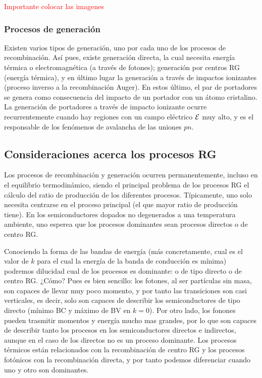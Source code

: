 \begin{Anotacion}
	\textcolor{red}{Importante colocar las imagenes}
\end{Anotacion}

\subsubsection{Procesos de generación}

Existen varios tipos de generación, uno por cada uno de los procesos de recombinación. Así pues, existe generación directa, la cual necesita energía térmica o electromagnética (a través de fotones); generación por centros RG (energía térmica), y en último lugar la generación a través de impactos ionizantes (proceso inverso a la recombinación Auger). En estos último, el par de portadores se genera como consecuencia del impacto de un portador con un átomo cristalino. La generación de portadores a través de impacto ionizante ocurre recurrentemente cuando hay regiones con un campo eléctrico $\mathcal{E}$ muy alto, y es el responsable de los fenómenos de avalancha de las uniones $pn$.

\subsection{Consideraciones acerca los procesos RG}

Los procesos de recombinación y generación ocurren permanentemente, incluso en el equilibrio termodinámico, siendo el principal problema de los procesos RG el cálculo del ratio de producción de los diferentes procesos. Típicamente, uno solo necesita centrarse en el proceso principal (el que mayor ratio de producción tiene). En los semiconductores dopados no degenerados a una temperatura ambiente, uno esperea que los procesos dominantes sean procesos directos o de centro RG. 

Conociendo la forma de las bandas de energía (más concretamente, cual es el valor de $k$ para el cual la energía de la banda de conducción es mínima) podremos dilucidad cual de los procesos es dominante: o de tipo directo o de centro RG. ¿Cómo? Pues es bien sencillo: los fotones, al ser partículas sin masa, son capaces de llevar muy poco momento, y por tanto las transiciones son casi verticales, es decir, solo son capaces de describir los semiconductores de tipo directo (mínimo BC y máximo de BV en $k=0$). Por otro lado, los fonones pueden trasmitir momentos y energía mucho mas grandes, por lo que son capaces de describir tanto los procesos en los semiconductores directos e indirectos, aunque en el caso de los directos no es un proceso dominante. Los procesos térmicos están relacionados con la recombinación de centro RG y los procesos fotónicos con la recombinación directa, y por tanto podemos diferenciar cuando uno y otro son dominantes. 


